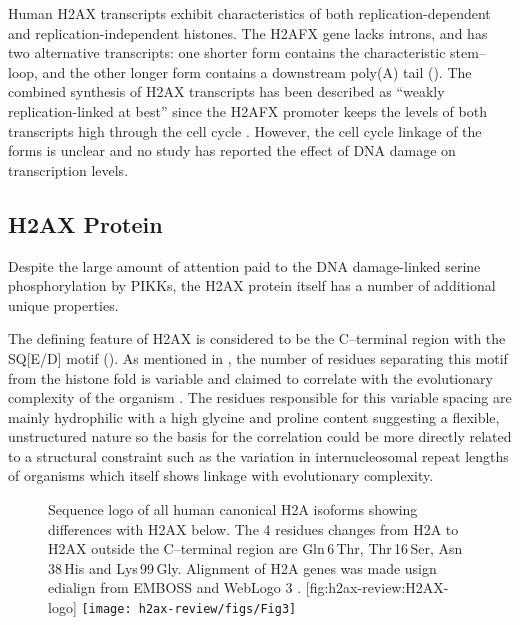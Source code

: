 Human H2AX transcripts exhibit characteristics of both
replication-dependent and replication-independent histones. The H2AFX
gene lacks introns, and has two alternative transcripts: one shorter
form contains the characteristic stem--loop, and the other longer form
contains a downstream poly(A) tail \citep{CMWMB89}
(). The combined synthesis of H2AX
transcripts has been described as ``weakly replication-linked at
best'' since the H2AFX promoter keeps the levels of both transcripts
high through the cell cycle \citep{VSI94}. However, the cell cycle
linkage of the forms is unclear and no study has reported the effect
of DNA damage on transcription levels.

\subsection{H2AX Protein}
\label{subsec:h2ax-review:H2AX-protein}
Despite the large amount of attention paid to the DNA damage-linked
serine phosphorylation by PIKKs, the H2AX protein itself has a number
of additional unique properties.

The defining feature of H2AX is considered to be the C--terminal
region with the SQ[E/D]\textPhi{} motif
(). As mentioned in
, the number of residues
separating this motif from the histone fold is variable and claimed to
correlate with the evolutionary complexity of the organism
\citep{CRDP+02}. The residues responsible for this variable spacing
are mainly hydrophilic with a high glycine and proline content
suggesting a flexible, unstructured nature so the basis for the
correlation could be more directly related to a structural constraint
such as the variation in internucleosomal repeat lengths of organisms
which itself shows linkage with evolutionary complexity.

\begin{figure}
\begin{sidecaption}%
                   {Sequence logo of all human canonical H2A isoforms
                     showing differences with H2AX below. The 4
                     residues changes from H2A to H2AX outside the
                     C--terminal region are Gln\,6\,Thr, Thr\,16\,Ser,
                     Asn\,38\,His and Lys\,99\,Gly. Alignment of H2A
                     genes was made usign edialign
                     \citep{Mor99} from EMBOSS
                     \citep{RLB00} and WebLogo 3
                     \citep{CHC+04}.}%
                   [fig:h2ax-review:H2AX-logo]
\centering
\texttt{[image: h2ax-review/figs/Fig3]}
\end{sidecaption}
\end{figure}

